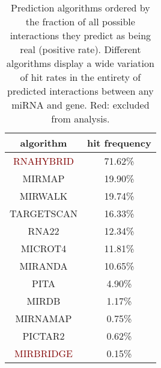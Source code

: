 
\begin{table}
\centering
\begin{tabular}{c | c}
algorithm & hit frequency\\ \hline
\hline
\textcolor{Maroon}{RNAHYBRID} & 71.62\%\\ \hline
\textcolor{OliveGreen}{MIRMAP} & 19.90\%\\ \hline
\textcolor{OliveGreen}{MIRWALK} & 19.74\%\\ \hline
\textcolor{OliveGreen}{TARGETSCAN} & 16.33\%\\ \hline
\textcolor{OliveGreen}{RNA22} & 12.34\%\\ \hline
\textcolor{OliveGreen}{MICROT4} & 11.81\%\\ \hline
\textcolor{OliveGreen}{MIRANDA} & 10.65\%\\ \hline
\textcolor{OliveGreen}{PITA} & 4.90\%\\ \hline
\textcolor{OliveGreen}{MIRDB} & 1.17\%\\ \hline
\textcolor{OliveGreen}{MIRNAMAP} & 0.75\%\\ \hline
\textcolor{OliveGreen}{PICTAR2} & 0.62\%\\ \hline
\textcolor{Maroon}{MIRBRIDGE} & 0.15\%\\ \hline
\end{tabular}
\caption{Prediction algorithms ordered by the fraction of all possible interactions they predict as being real (positive rate). Different algorithms display a wide variation of hit rates in the entirety of predicted interactions between any miRNA and gene. Red: excluded from analysis.}
\label{tab:alg.hit.freq.all}
\end{table}

